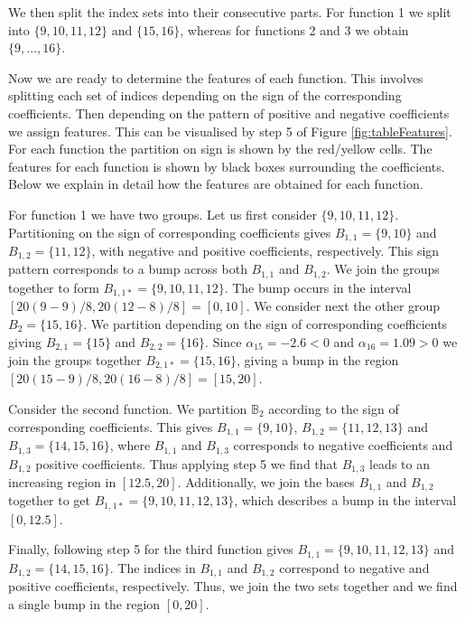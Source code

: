 \documentclass[../main.tex]{subfiles}
\begin{document}
  We then split the index sets into their consecutive parts. For function 1 we split into $\{9, 10, 11, 12\}$ and $\{15, 16\}$, whereas for functions 2 and 3 we obtain $\{9, \dots, 16\}$.
  
  Now we are ready to determine the features of each function. This involves splitting each set of indices depending on the sign of the corresponding coefficients. Then depending on the pattern of positive and negative coefficients we assign features.  This can be visualised by step 5 of Figure \ref{fig:tableFeatures}. For each function the partition on sign is shown by the red/yellow cells. The features for each function is shown by black boxes surrounding the coefficients. Below we explain in detail how the features are obtained for each function.
     
  For function 1 we have two groups. Let us first consider $\{9,10,11,12\}$. Partitioning on the sign of corresponding coefficients gives $B_{1,1} =\{9,10\}$ and $B_{1,2}=\{11,12\}$, with negative and positive coefficients, respectively. This sign pattern corresponds to a bump across both  $B_{1,1}$ and  $B_{1,2}$. We join the groups together to form $B_{1,1*} = \{9,10,11,12\}$. The bump occurs in the interval $[20(9-9)/8 , 20(12-8)/8] = [0,10]$. We consider next the other group $B_{2} = \{15,16\}$. We partition depending on the sign of corresponding coefficients giving $B_{2,1} = \{15\}$ and $B_{2,2} = \{16\}$. Since $\alpha_{15} = -2.6 < 0$ and $\alpha_{16} = 1.09 > 0$  we join the  groups together $B_{2,1*} = \{15,16\}$, giving a bump in the region $[20(15-9)/8 , 20(16-8)/8] = [15,20]$.
  
  Consider the second function. We partition $\mathbb{B}_2$ according to the sign of corresponding coefficients. This gives $B_{1,1} = \{9,10\}$, $B_{1,2} = \{11,12,13\}$ and $B_{1,3} = \{14,15,16\}$, where $B_{1,1}$ and $B_{1,3}$ corresponds to negative coefficients and $B_{1,2}$ positive coefficients. Thus applying step 5 we find that $B_{1,3}$ leads to an increasing region in $[12.5,20]$. Additionally, we join the bases $B_{1,1}$ and $B_{1,2}$ together to get $B_{1,1*} = \{9,10,11,12,13\}$, which describes a bump in the interval $[0,12.5]$. 
   
  Finally, following step 5 for the third function gives $B_{1,1} =  \{9,10,11,12,13\}$ and $B_{1,2} = \{14,15,16\}$. The indices in $B_{1,1}$ and $B_{1,2}$ correspond to negative and positive coefficients, respectively. Thus, we join the two sets together and we find a single bump in the region $[0,20]$.
  
\end{document}
